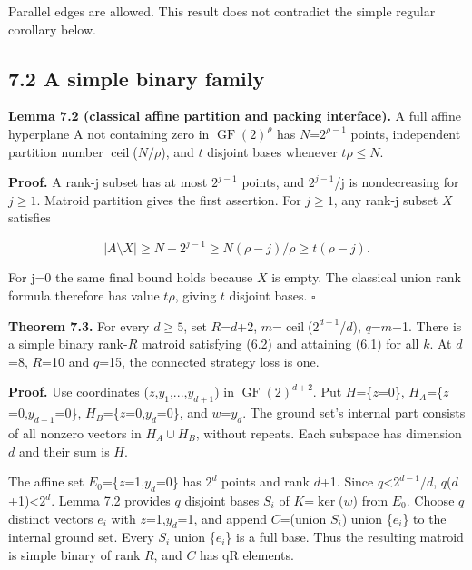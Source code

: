 \documentclass[11pt]{article}
\begin{document}
Parallel edges are allowed. This result does not contradict the simple regular corollary below.

\subsection*{7.2 A simple binary family}

\textbf{Lemma 7.2 (classical affine partition and packing interface).} A full affine hyperplane A not containing zero in \(\operatorname{GF}(2)^\rho\) has \(N\)=\(2^{\rho-1}\) points, independent partition number \(\operatorname{ceil}\)(\(N/\rho\)), and \(t\) disjoint bases whenever \(t\rho\)\(\le\)\(N\).

\textbf{Proof.} A rank-j subset has at most \(2^{j-1}\) points, and \(2^{j-1}\)/j is nondecreasing for \(j\ge1\). Matroid partition gives the first assertion. For \(j\ge1\), any rank-j subset \(X\) satisfies

\[
|A\setminus X|\ge N-2^{j-1}\ge N(\rho-j)/\rho\ge t(\rho-j).
\]

For j=0 the same final bound holds because \(X\) is empty. The classical union rank formula therefore has value \(t\rho\), giving \(t\) disjoint bases. \hfill\ensuremath{\square}

\textbf{Theorem 7.3.} For every \(d\ge5\), set \(R\)=\(d\)+2, \(m\)=\(\operatorname{ceil}\)(\(2^{d-1}\)/\(d\)), \(q\)=\(m\)\ensuremath{-}1. There is a simple binary rank-\(R\) matroid satisfying (6.2) and attaining (6.1) for all \(k\). At \(d\)=8, \(R\)=10 and \(q\)=15, the connected strategy loss is one.

\textbf{Proof.} Use coordinates (\(z\),\(y_1\),...,\(y_{d+1}\)) in \(\operatorname{GF}(2)^{d+2}\). Put \(H\)=\{\(z\)=0\}, \(H_A\)=\{\(z\)=0,\(y_{d+1}\)=0\}, \(H_B\)=\{\(z\)=0,\(y_d\)=0\}, and \(w\)=\(y_d\). The ground set's internal part consists of all nonzero vectors in \(H_A\cup H_B\), without repeats. Each subspace has dimension \(d\) and their sum is \(H\).

The affine set \(E_0\)=\{\(z\)=1,\(y_d\)=0\} has \(2^d\) points and rank \(d\)+1. Since \(q\)<\(2^{d-1}\)/\(d\), \(q\)(\(d\)+1)<\(2^d\). Lemma 7.2 provides \(q\) disjoint bases \(S_i\) of \(K\)=\(\ker\)(\(w\)) from \(E_0\). Choose \(q\) distinct vectors \(e_i\) with \(z\)=1,\(y_d\)=1, and append \(C\)=(union \(S_i\)) union \{\(e_i\)\} to the internal ground set. Every \(S_i\) union \{\(e_i\)\} is a full base. Thus the resulting matroid is simple binary of rank \(R\), and \(C\) has qR elements.
\end{document}
